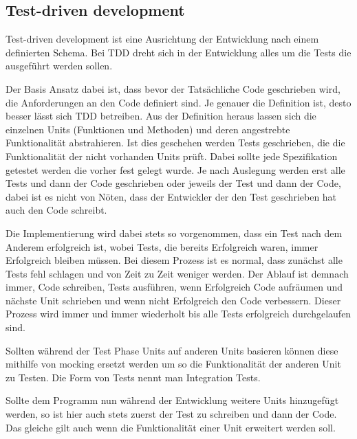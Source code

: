 \subsection{Test-driven development}\label{einleitung:tdd}

Test-driven development ist eine Ausrichtung der Entwicklung nach einem definierten Schema.
Bei TDD dreht sich in der Entwicklung alles um die Tests die ausgeführt werden sollen.

Der Basis Ansatz dabei ist, dass bevor der Tatsächliche Code geschrieben wird, die Anforderungen
an den Code definiert sind. Je genauer die Definition ist, desto besser lässt sich TDD betreiben.
Aus der Definition heraus lassen sich die einzelnen Units (Funktionen und Methoden) und deren
angestrebte Funktionalität abstrahieren. Ist dies geschehen werden Tests geschrieben, die die
Funktionalität der nicht vorhanden Units prüft. Dabei sollte jede Spezifikation getestet werden
die vorher fest gelegt wurde. Je nach Auslegung werden erst alle Tests und dann der Code geschrieben
oder jeweils der Test und dann der Code, dabei ist es nicht von Nöten, dass der Entwickler der den
Test geschrieben hat auch den Code schreibt.

Die Implementierung wird dabei stets so vorgenommen, dass ein Test nach dem Anderem erfolgreich ist,
wobei Tests, die bereits Erfolgreich waren, immer Erfolgreich bleiben müssen. Bei diesem Prozess ist
es normal, dass zunächst alle Tests fehl schlagen und von Zeit zu Zeit weniger werden. Der Ablauf ist
demnach immer, Code schreiben, Tests ausführen, wenn Erfolgreich Code aufräumen und nächste Unit
schrieben und wenn nicht Erfolgreich den Code verbessern. Dieser Prozess wird immer und immer
wiederholt bis alle Tests erfolgreich durchgelaufen sind.

Sollten während der Test Phase Units auf anderen Units basieren können diese mithilfe von
\gls{mock}ing ersetzt werden um so die Funktionalität der anderen Unit zu Testen. Die Form von Tests
nennt man Integration Tests.

Sollte dem Programm nun während der Entwicklung weitere Units hinzugefügt werden, so ist hier auch
stets zuerst der Test zu schreiben und dann der Code. Das gleiche gilt auch wenn die Funktionalität
einer Unit erweitert werden soll.


